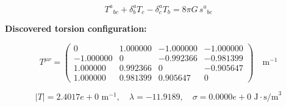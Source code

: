 
\begin{equation}
  T^a{}_{bc} + \delta^a_b T_c - \delta^a_c T_b = 8\pi G \, s^a{}_{bc}
\end{equation}

\textbf{Discovered torsion configuration:}

\begin{equation}
  T^{\mu\nu} = \begin{pmatrix}
    0 & 1.000000 & -1.000000 & -1.000000 \\
    -1.000000 & 0 & -0.992366 & -0.981399 \\
    1.000000 & 0.992366 & 0 & -0.905647 \\
    1.000000 & 0.981399 & 0.905647 & 0
  \end{pmatrix} \quad \text{m}^{-1}
\end{equation}

\begin{equation}
  |T| = 2.4017e+0 \text{ m}^{-1}, \quad
  \lambda = -11.9189, \quad
  \sigma = 0.0000e+0 \text{ J}\cdot\text{s/m}^3
\end{equation}